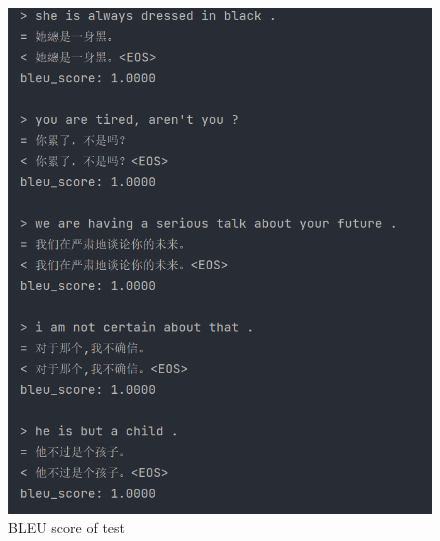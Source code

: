 \documentclass[journal, a4paper]{IEEEtran}
\begin{document}
	
	\begin{figure}
		\begin{center}
		\includegraphics[width=\columnwidth]{images/bleu.png}
		\caption{BLEU score of test}
		\label{fig:bleu}
		\end{center}
	\end{figure}
	
	

\printbibliography

\end{document}
